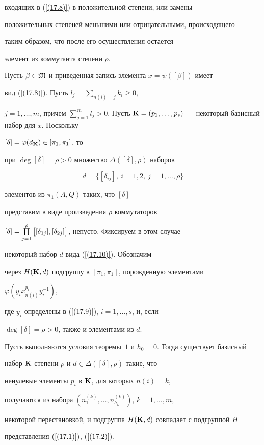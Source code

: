 входящих в (\ref{(17.8)}) в положительной степени, или замены


положительных степеней меньшими или отрицательными, происходящего 


таким образом, что после его осуществления остается


элемент из коммутанта степени $\rho$.





Пусть $\beta\in\frak M$ и приведенная запись элемента $x=\psi([\beta])$ имеет


вид (\ref{(17.8)}). Пусть $l_j=\sum\limits_{n(i)=j}k_i\ge0$,


$j=1,\dotsc,m$, причем $\sum\limits_{j=1}^ml_j>0$. Пусть $\bold K=(p_1,\dotsc


,p_s)$ --- некоторый базисный набор для $x$. Поскольку


$[\delta]=\varphi(d_{\bold K})\in[\pi_1,\pi_1]$, то


при $\deg[\delta]=\rho>0$ множество $\Delta([\delta],\rho)$ наборов


\begin{equation}


d=\{[\delta_{ij}], \ i=1,2,\ j=1,\dotsc,\rho \}


\label{(17.10)}


\end{equation}


элементов из $\pi_1(A,Q)$ таких, что $[\delta]$


представим в виде произведения $\rho $ коммутаторов


$[\delta]=\PL_{j=1}^\rho\big[


[\delta_{1j}],[\delta_{2j}]\big]$, непусто. Фиксируем в этом случае 


некоторый набор $d$ вида (\ref{(17.10)}). Обозначим


через $H(\bold K,d)$ подгруппу в $[\pi_1,\pi_1]$, порожденную элементами


$\varphi(y_i x^{p_i}_{n(i)}y^{-1}_i)$,


где $y_i$ определены в (\ref{(17.9)}), $i=1,\dotsc,s$, и, если


$\deg[\delta]=\rho>0$, также и элементами из $d$.





\begin{thm}


Пусть выполняются условия теоремы~$1$ и $h_0=0$. Тогда существует базисный


набор $\bold K$ степени $\rho $ и $d\in\Delta([\delta],\rho)$ такие, что


ненулевые элементы $p_i$ в $\bold K$, для которых $n(i)=k$,


получаются из набора $(n^{(k)}_1,\dotsc,n^{(k)}_{h_k})$, $k=1,\dotsc,m$, 


некоторой перестановкой, и подгруппа $H(\bold K,d)$ совпадает с подгруппой $H$


представления $(\ref{(17.1)})$, $(\ref{(17.2)})$.


\end{thm}


